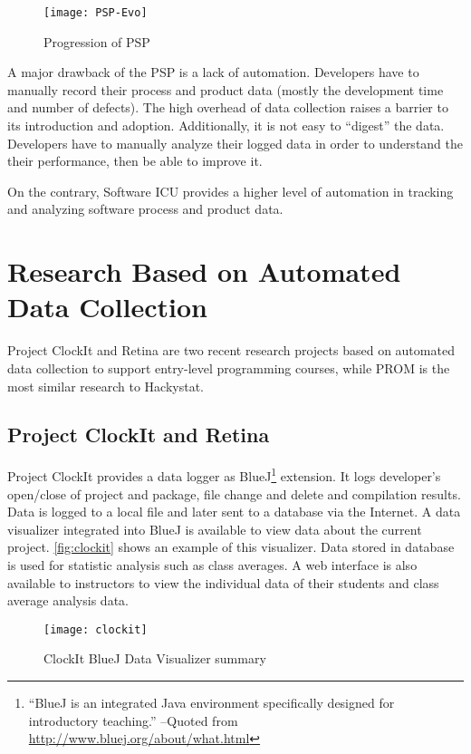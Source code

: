 \begin{figure}[htbp] %
   \centering
   \texttt{[image: PSP-Evo]} 
   \caption{Progression of PSP}
   \label{fig:PSP-Evo}
\end{figure}


A major drawback of the PSP is a lack of automation. Developers have to manually record their process and product data (mostly the development time and number of defects). The high overhead of data collection raises a barrier to its introduction and adoption. Additionally, it is not easy to ``digest'' the data. Developers have to manually analyze their logged data in order to understand the their performance, then be able to improve it.

On the contrary, Software ICU provides a higher level of automation in tracking and analyzing software process and product data.


\section {Research Based on Automated Data Collection}
Project ClockIt and Retina are two recent research projects based on automated data collection to support entry-level programming courses, while PROM is the most similar research to Hackystat.

\subsection {Project ClockIt and Retina}
Project ClockIt provides a data logger as BlueJ\footnote{``BlueJ is an integrated Java environment specifically designed for introductory teaching.'' --Quoted from \url{http://www.bluej.org/about/what.html}} extension. It logs developer's open/close of project and package, file change and delete and compilation results. Data is logged to a local file and later sent to a database via the Internet. A data visualizer integrated into BlueJ is available to view data about the current project. \autoref{fig:clockit} shows an example of this visualizer. Data stored in database is used for statistic analysis such as class averages. A web interface is also available to instructors to view the individual data of their students and class average analysis data.

\begin{figure}[htbp] %
   \centering
   \texttt{[image: clockit]} 
   \caption{ClockIt BlueJ Data Visualizer summary}
   \label{fig:clockit}
\end{figure}

